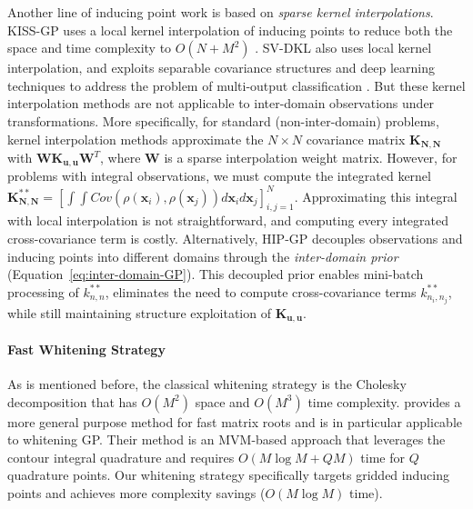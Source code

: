 Another line of inducing point work is based on \emph{sparse kernel interpolations}.
KISS-GP uses a local kernel interpolation of inducing points
to reduce both the space and time complexity to $O(N+M^2)$ \citep{wilson2015kernel}.
SV-DKL also uses local kernel interpolation, and
exploits separable covariance structures and deep learning techniques
to address the problem of multi-output classification \citep{wilson2016stochastic}.
But these kernel interpolation methods are not applicable to
inter-domain observations under transformations.
More specifically, for standard (non-inter-domain) problems,  kernel interpolation methods approximate the $N \times N$ covariance matrix $\mathbf{K}_{\mathbf{N,N}}$ with $\mathbf{W} \mathbf{K}_{\mathbf{u, u}}\mathbf{W}^T$, where $\mathbf{W}$ is a sparse interpolation weight matrix. 
 However, for problems with integral observations, we must compute the integrated kernel $\mathbf{K}^{**}_{\mathbf{N,N}} = [\int \int Cov(\rho(\mathbf{x}_i), \rho(\mathbf{x}_j)) d\mathbf{x}_i d \mathbf{x}_j]_{i,j=1}^N$.
  Approximating this integral with local interpolation is not straightforward, and computing every integrated cross-covariance term is costly.
  Alternatively, HIP-GP decouples observations and inducing points into different domains
  through the \textit{inter-domain prior} (Equation~\ref{eq:inter-domain-GP}).
  This decoupled prior enables mini-batch processing of $k_{n,n}^{**}$, eliminates the need to compute cross-covariance terms  $k_{{n_i}, {n_j}}^{**}$,
  while still maintaining structure exploitation of $\mathbf{K}_{\mathbf{u,u}}$. 
  
 \paragraph{Fast Whitening Strategy} As is mentioned before, the classical whitening strategy is the Cholesky decomposition that has $O(M^2)$ space and $O(M^3)$ time complexity. 
 \citet{pleiss2020fast} provides a more general purpose method for fast matrix roots and is in particular applicable to whitening GP. Their method is an MVM-based  approach that leverages the contour integral quadrature and  requires $O(M \log M+QM)$ time for $Q$ quadrature points. Our whitening strategy specifically targets gridded inducing points and achieves more complexity savings ($O(M\log M)$ time). 
  
 
